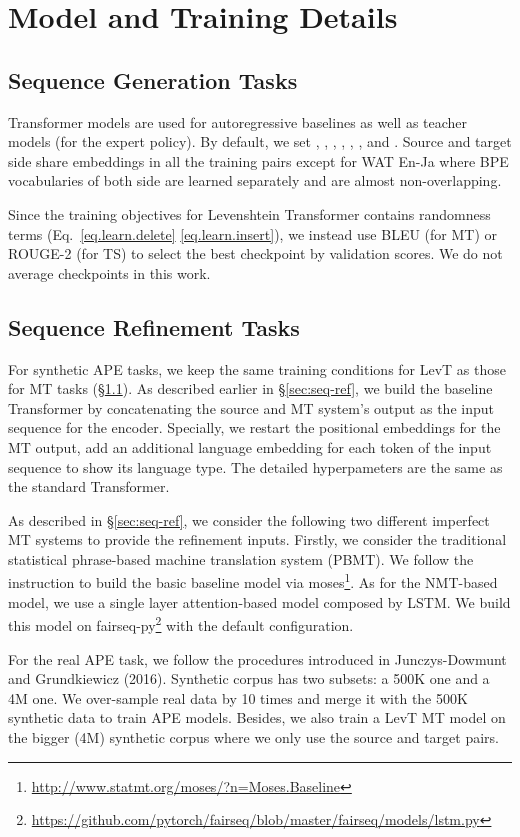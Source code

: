 \documentclass{article}
\newcommand{\secref}[1]{\S\ref{#1}}
\begin{document}
\section{Model and Training Details}
\subsection{Sequence Generation Tasks}
\label{apx.gen}
Transformer models are used for autoregressive baselines as well as teacher models (for the expert policy). By default, we set , , , , , ,  and . Source and target side share embeddings in all the training pairs except for WAT En-Ja where BPE vocabularies of both side are learned separately and are almost non-overlapping. 

Since the training objectives for Levenshtein Transformer contains randomness terms (Eq.~\eqref{eq.learn.delete} \eqref{eq.learn.insert}), we instead use BLEU (for MT) or ROUGE-2 (for TS) to select the best checkpoint by validation scores. We do not average checkpoints in this work.

\subsection{Sequence Refinement Tasks}
For synthetic APE tasks, we keep the same training conditions for LevT as those for MT tasks (\secref{apx.gen}). 
As described earlier in \secref{sec:seq-ref}, we build the baseline Transformer by concatenating
the source and MT system’s output as the input sequence for the encoder. Specially, we restart the
positional embeddings for the MT output, add an additional language embedding for each token of the input sequence to show its language type. The detailed hyperpameters are the same as the
standard Transformer.

As described in \secref{sec:seq-ref}, we consider the following two different imperfect MT systems to provide the
refinement inputs. Firstly, we consider the traditional statistical phrase-based machine translation
system (PBMT). We follow the instruction to build the basic baseline model via moses\footnote{\url{http://www.statmt.org/moses/?n=Moses.Baseline}}. 
As for the NMT-based model, we use a single layer attention-based model composed by LSTM. We build this
model on fairseq-py\footnote{\url{https://github.com/pytorch/fairseq/blob/master/fairseq/models/lstm.py}} with the default configuration.

For the real APE task, we follow the procedures introduced in Junczys-Dowmunt and Grundkiewicz
(2016). Synthetic corpus has two subsets: a 500K one and a 4M one. We over-sample real data by 10
times and merge it with the 500K synthetic data to train APE models. Besides, we also train a LevT
MT model on the bigger (4M) synthetic corpus where we only use the source and target pairs.
\end{document}

